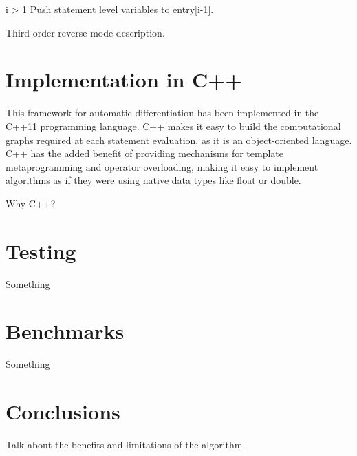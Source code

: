 \documentclass[oneside]{article}
\begin{document}
\begin{algorithm*}[!htb]
\begin{algorithmic}[1]
\begin{varwidth}[t]{\linewidth}
\end{varwidth}
\EndFor
\EndFor
\EndFor
\If i > 1
\State Push statement level variables to entry[i-1].
\EndIf
\EndFor

\end{algorithmic}
 \end{algorithm*}



\begin{editnote}
Third order reverse mode description.
\end{editnote}

\section{Implementation in C++}
This framework for automatic differentiation has been implemented in the C++11 programming language. C++ makes it easy to build the computational graphs required at each statement evaluation, as it is an object-oriented language. C++ has the added benefit of providing mechanisms for template metaprogramming and operator overloading, making it easy to implement algorithms as if they were using native data types like float or double.

\begin{editnote}
Why C++?
\end{editnote}

\section{Testing}

Something

\section{Benchmarks}

Something

\section{Conclusions}

\begin{editnote}
Talk about the benefits and limitations of the algorithm.
\end{editnote}
\end{document}
